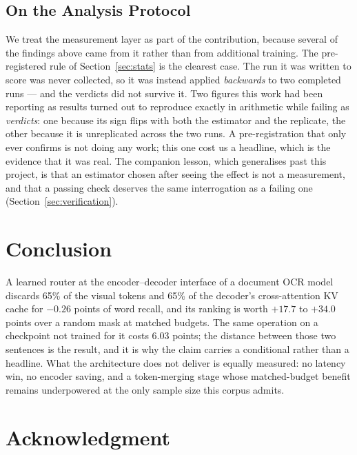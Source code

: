 \documentclass[conference]{IEEEtran}
\begin{document}
\subsection{On the Analysis Protocol}

We treat the measurement layer as part of the contribution, because several of the findings
above came from it rather than from additional training. The pre-registered rule of
Section~\ref{sec:stats} is the clearest case. The run it was written to score was never
collected, so it was instead applied \emph{backwards} to two completed runs --- and the
verdicts did not survive it. Two figures this work had been reporting as results turned out
to reproduce exactly in arithmetic while failing as \emph{verdicts}: one because its sign
flips with both the estimator and the replicate, the other because it is unreplicated across
the two runs. A pre-registration that only ever confirms is not doing any work; this one cost
us a headline, which is the evidence that it was real. The companion lesson, which
generalises past this project, is that an estimator chosen after seeing the effect is not a
measurement, and that a passing check deserves the same interrogation as a failing one
(Section~\ref{sec:verification}).

\section{Conclusion}

A learned router at the encoder--decoder interface of a document OCR model discards 65\% of
the visual tokens and 65\% of the decoder's cross-attention KV cache for $-0.26$ points of
word recall, and its ranking is worth $+17.7$ to $+34.0$ points over a random mask at matched
budgets. The same operation on a checkpoint not trained for it costs $6.03$ points; the
distance between those two sentences is the result, and it is why the claim carries a
conditional rather than a headline. What the architecture does not deliver is equally
measured: no latency win, no encoder saving, and a token-merging stage whose matched-budget
benefit remains underpowered at the only sample size this corpus admits.

\section*{Acknowledgment}
\end{document}
